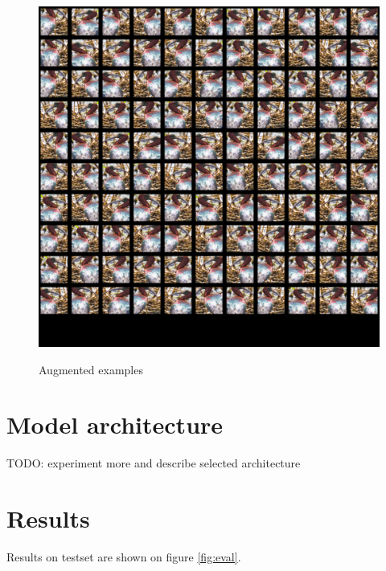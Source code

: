 \documentclass[a4paper]{article}
\begin{document}
\begin{figure}[h]
    \caption[]{Augmented examples}
    \centering
    \includegraphics[page=2,width=1.0\textwidth]{aug2.png}
    \label{fig:aug2}
\end{figure}

\section{Model architecture}

TODO: experiment more and describe selected architecture

\section{Results}
Results on testset are shown on figure \ref{fig:eval}.
\end{document}

